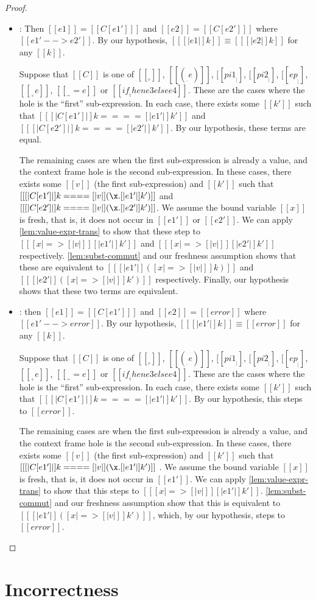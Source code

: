 \documentclass[11pt]{article}
\newcommand{\rrule}[1]{\rref*{#1}}
\begin{document}
\begin{proof}
\begin{itemize}
		\item \rrule{RedContext}: Then $[[e1]]=[[C[e1'] ]] $ and $[[e2]]=[[C[e2'] ]] $ where $[[e1' --> e2']]$.
		By our hypothesis, $[[ [|e1|]k ]] \equiv [[ [|e2|]k ]]$ for any $[[k]]$.
 
		Suppose that $[[C]]$ is one of $[[ __ e]]$, $[[(__, e)]]$, $[[pi1 __]]$, $[[pi2 __]]$, $[[ep __]]$,
		$[[__ + e]]$, $[[__ == e]]$ or $[[if __ then e3 else e4]]$. These are the cases where the hole is the ``first''
		sub-expression. 
		In each case, there exists some $[[k']]$ such that $[[ [|C[e1'] |]k ==== [|e1'|]k' ]]$ and 
		$[[ [|C[e2'] |]k ==== [|e2'|]k' ]]$. By our hypothesis, these terms are equal.
		
		The remaining cases are when the first sub-expression is already a value, and the context frame hole is the second sub-expression.
		In these cases, there exists some $[[v]]$ (the first sub-expression) and $[[k']]$
		such that $[[ [|C[e1'] |]k ==== [|v|](\x . [|e1'|]k' ) ]]$ and $[[ [|C[e2'] |]k ==== [|v|](\x . [|e2'|]k' ) ]]$.
		We assume the bound variable $[[x]]$ is fresh, that is, it does not occur in $[[e1']]$ or $[[e2']]$.
		We can apply \autoref{lem:value-expr-trans} to show that these step to $[[ [x |=> [|v|] ][|e1'|]k' ]]$
		and $[[ [x |=> [|v|] ][|e2'|]k' ]]$ respectively. \autoref{lem:subst-commut} and our freshness assumption 
		shows that these are equivalent to
		$[[ [| e1' |]( [x |=> [|v|] ]k ) ]]$ and $[[ [| e2' |]([x |=> [|v|] ]k') ]]$ respectively.
		Finally, our hypothesis shows that these two terms are equivalent.

		\item \rrule{RedContextFail}: then $[[e1]]=[[C[e1'] ]] $ and $[[e2]]=[[error]] $ where $[[e1' --> error]]$.
		By our hypothesis, $[[ [|e1'|]k ]] \equiv [[ error ]]$ for any $[[k]]$.

		Suppose that $[[C]]$ is one of $[[ __ e]]$, $[[(__, e)]]$, $[[pi1 __]]$, $[[pi2 __]]$, $[[ep __]]$,
		$[[__ + e]]$, $[[__ == e]]$ or $[[if __ then e3 else e4]]$. These are the cases where the hole is the ``first''
		sub-expression. 
		In each case, there exists some $[[k']]$ such that $[[ [|C[e1'] |]k ==== [|e1'|]k' ]]$. By our hypothesis,
		this steps to $[[error]]$.

		
		The remaining cases are when the first sub-expression is already a value, and the context frame hole is the second sub-expression.
		In these cases, there exists some $[[v]]$ (the first sub-expression) and $[[k']]$
		such that $[[ [|C[e1'] |]k ==== [|v|](\x . [|e1'|]k' ) ]]$ .
		We assume the bound variable $[[x]]$ is fresh, that is, it does not occur in $[[e1']]$.
		We can apply \autoref{lem:value-expr-trans} to show that this steps to $[[ [x |=> [|v|] ][|e1'|]k' ]]$.
		 \autoref{lem:subst-commut} and our freshness assumption 
		show that this is equivalent to
		$[[ [| e1' |]([x |=> [|v|] ]k') ]]$, which, by our hypothesis,
		steps to $[[error]]$.
		

		  
	\end{itemize}
\end{proof}
 
\section{Incorrectness}

  
\end{document}
